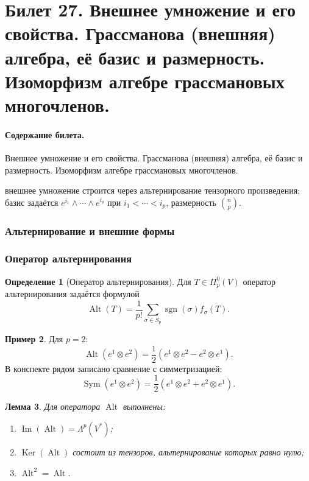 \documentclass[12pt,a4paper]{article}
\theoremstyle{definition}
\newtheorem{definition}{Определение}[section]
\newtheorem{example}[definition]{Пример}
\theoremstyle{plain}
\newtheorem{lemma}[definition]{Лемма}
\theoremstyle{remark}
\newenvironment{planadd}{\begin{planbox}}{\end{planbox}}
\newcommand{\Ker}{\operatorname{Ker}}
\newcommand{\Imop}{\operatorname{Im}}
\newcommand{\Sym}{\operatorname{Sym}}
\newcommand{\Alt}{\operatorname{Alt}}
\providecommand{\sgn}{\operatorname{sgn}}
\begin{document}
\clearpage

\section{Билет 27. Внешнее умножение и его свойства. Грассманова (внешняя) алгебра, её базис и размерность. Изоморфизм алгебре грассмановых многочленов.}

\paragraph{Содержание билета.} Внешнее умножение и его свойства. Грассманова (внешняя) алгебра, её базис и размерность. Изоморфизм алгебре грассмановых многочленов.

\begin{planadd}

внешнее умножение строится через альтернирование тензорного произведения; базис задаётся $e^{i_1}\wedge\cdots\wedge e^{i_p}$ при $i_1<\cdots<i_p$, размерность $\binom np$.

\end{planadd}

\subsubsection{Альтернирование и внешние формы}

\subsubsection*{Оператор альтернирования}

\begin{definition}[Оператор альтернирования]
Для $T\in\Pi^0_p(V)$ оператор альтернирования задаётся формулой
\[
    \Alt(T)=\frac{1}{p!}\sum_{\sigma\in S_p}\sgn(\sigma)f_\sigma(T).
\]
\end{definition}

\begin{example}
Для $p=2$:
\[
    \Alt(e^1\otimes e^2)
    =
    \frac{1}{2}(e^1\otimes e^2-e^2\otimes e^1).
\]
В конспекте рядом записано сравнение с симметризацией:
\[
    \Sym(e^1\otimes e^2)
    =
    \frac{1}{2}(e^1\otimes e^2+e^2\otimes e^1).
\]
\end{example}

\begin{lemma}
Для оператора $\Alt$ выполнены:
\begin{enumerate}[label=\arabic*)]
    \item $\Imop(\Alt)=\Lambda^p(V^*)$;
    \item $\Ker(\Alt)$ состоит из тензоров, альтернирование которых равно нулю;
    \item $\Alt^2=\Alt$.
\end{enumerate}
\end{lemma}
\end{document}
